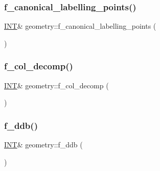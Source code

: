 \mbox{\label{classgeometry_a0695b0c3dc2a75a232631dfda609daf7}} 
\subsubsection{\texorpdfstring{f\+\_\+canonical\+\_\+labelling\+\_\+points()}{f\_canonical\_labelling\_points()}}
{\footnotesize\ttfamily \mbox{\hyperlink{galois_8h_a09fddde158a3a20bd2dcadb609de11dc}{I\+NT}}\& geometry\+::f\+\_\+canonical\+\_\+labelling\+\_\+points (\begin{DoxyParamCaption}{ }\end{DoxyParamCaption})\hspace{0.3cm}{\ttfamily [inline]}}

\mbox{\label{classgeometry_ae0713575216fd4c562da43a469f5edcb}} 
\subsubsection{\texorpdfstring{f\+\_\+col\+\_\+decomp()}{f\_col\_decomp()}}
{\footnotesize\ttfamily \mbox{\hyperlink{galois_8h_a09fddde158a3a20bd2dcadb609de11dc}{I\+NT}}\& geometry\+::f\+\_\+col\+\_\+decomp (\begin{DoxyParamCaption}{ }\end{DoxyParamCaption})\hspace{0.3cm}{\ttfamily [inline]}}

\mbox{\label{classgeometry_a1b01f7c645961c3a04b167fc2bf0d2c8}} 
\subsubsection{\texorpdfstring{f\+\_\+ddb()}{f\_ddb()}}
{\footnotesize\ttfamily \mbox{\hyperlink{galois_8h_a09fddde158a3a20bd2dcadb609de11dc}{I\+NT}}\& geometry\+::f\+\_\+ddb (\begin{DoxyParamCaption}{ }\end{DoxyParamCaption})\hspace{0.3cm}{\ttfamily [inline]}}


